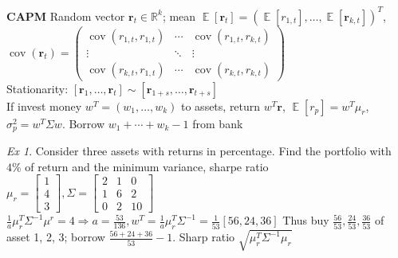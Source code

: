 \documentclass[10pt,landscape, a4paper]{article}
\theoremstyle{remark}
\newtheorem*{Ex}{Ex}
\newcommand{\E}{\operatorname{\mathbb{E}}}
\newcommand{\cov}[1]{\operatorname{cov}(#1)}
\begin{document}
\begin{multicols*}{3}
\textbf{CAPM} Random vector $\bm{r}_t \in \mathbb{R}^k$; mean $\E [\bm{r}_t] = (\E [r_{1, t}], \dots, \E [\bm{r}_{k, t}])^T$, $\cov{\bm{r}_t} = \begin{pmatrix}
    \cov{r_{1, t}, r_{1, t}} &\cdots &\cov{r_{1, t}, r_{k, t}}\\
    \vdots &\ddots &\vdots\\
    \cov{r_{k, t}, r_{1, t}} & \cdots &\cov{r_{k, t}, r_{k, t}}
\end{pmatrix}$\\ 
Stationarity: $[\bm{r}_1 , \dots , \bm{r}_t] \sim [\bm{r}_{1+s}, \dots, \bm{r}_{t+s}]$\\
If invest money $w^T = (w_1, \dots, w_k)$ to assets, return $w^T \bm{r}$, $\E[r_p] = w^T \mu_r$, $\sigma^2_p = w^T \Sigma w$. Borrow $w_1 + \cdots + w_k - 1$ from bank

\begin{Ex}
    Consider three assets with returns in percentage. Find the portfolio with $4\%$ of return and the minimum variance, sharpe ratio
    $\mu_r = \begin{bmatrix}
        1\\4\\3
    \end{bmatrix}, \Sigma=\begin{bmatrix}
        2 &1 &0 \\
        1 &6 &2 \\
        0 &2 &10
    \end{bmatrix}$\\
    $\frac{1}{a} \mu^T_r \Sigma^{-1} \mu^r = 4 \Rightarrow a = \frac{53}{136}, w^T = \frac{1}{a} \mu^T_r \Sigma^{-1} = \frac{1}{53} [56, 24, 36]$ Thus buy $\frac{56}{53}, \frac{24}{53}, \frac{36}{53}$ of asset 1, 2, 3; borrow $\frac{56+24+36}{53} - 1$. Sharp ratio $\sqrt{\mu^T_r \Sigma^{-1} \mu_r}$
\end{Ex}


\end{multicols*}
\end{document}
